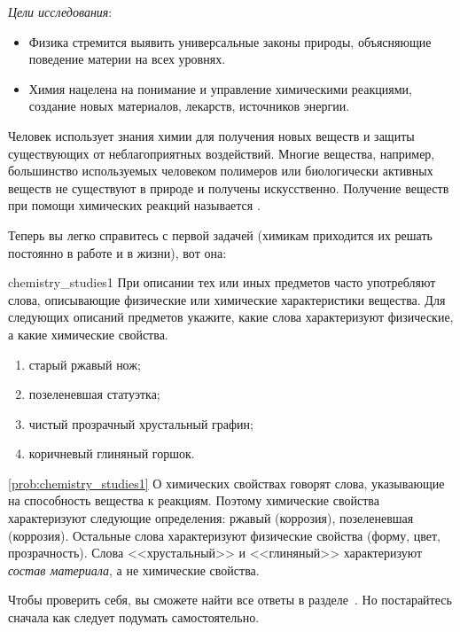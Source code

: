 \textit{Цели исследования}:

\begin{itemize}
    \item Физика стремится выявить универсальные законы природы, объясняющие поведение материи на всех уровнях.
    \item Химия нацелена на понимание и управление химическими реакциями, создание новых материалов, лекарств, источников энергии.
\end{itemize}

Человек использует знания химии для получения новых веществ и защиты существующих от неблагоприятных воздействий. Многие вещества, например, большинство используемых человеком полимеров или биологически активных веществ не существуют в природе и получены искусственно. Получение веществ при помощи химических реакций называется .

Теперь вы легко справитесь с первой задачей (химикам приходится их решать постоянно в работе и в жизни), вот она:

\begin{problem}{}{chemistry_studies1}
    При описании тех или иных предметов часто употребляют слова, описывающие физические или химические характеристики вещества. Для следующих описаний предметов укажите, какие слова характеризуют физические, а какие химические свойства.
    \begin{enumerate}[label=\alph*)]
        \item старый ржавый нож;
        \item позеленевшая статуэтка;
        \item чистый прозрачный хрустальный графин;
        \item коричневый глиняный горшок.
    \end{enumerate}

    \begin{sol}{\ref{prob:chemistry_studies1}}
        О химических свойствах говорят слова, указывающие на способность вещества к реакциям. Поэтому химические свойства характеризуют следующие определения: ржавый (коррозия), позеленевшая (коррозия). Остальные слова характеризуют физические свойства (форму, цвет, прозрачность). Слова <<хрустальный>> и <<глиняный>> характеризуют \emph{состав материала}, а не химические свойства.
    \end{sol}
\end{problem}

Чтобы проверить себя, вы сможете найти все ответы в разделе~. Но постарайтесь сначала как следует подумать самостоятельно.

